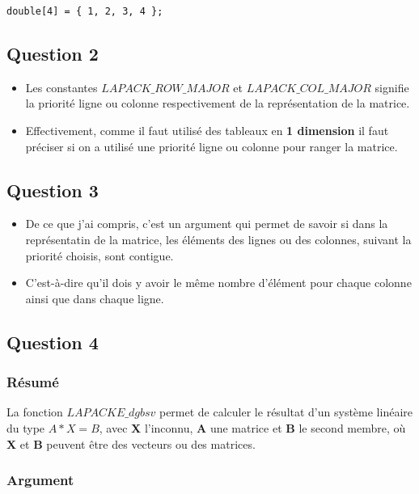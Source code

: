 \documentclass[11pt]{article}
\begin{document}
\begin{verbatim}
double[4] = { 1, 2, 3, 4 };
\end{verbatim}

\subsection{Question 2}
\label{sec:org1adee99}

\begin{itemize}
\item Les constantes \(LAPACK\_ROW\_MAJOR\) et \(LAPACK\_COL\_MAJOR\)
signifie la priorité ligne ou colonne respectivement de la
représentation de la matrice.
\item Effectivement, comme il faut utilisé des tableaux en \textbf{1 dimension}
il faut préciser si on a utilisé une priorité ligne ou colonne pour
ranger la matrice.
\end{itemize}

\subsection{Question 3}
\label{sec:org107d882}

\begin{itemize}
\item De ce que j'ai compris, c'est un argument qui permet de savoir si
dans la représentatin de la matrice, les éléments des lignes ou des
colonnes, suivant la priorité choisis, sont contigue.

\item C'est-à-dire qu'il dois y avoir le même nombre d'élément pour
chaque colonne ainsi que dans chaque ligne.
\end{itemize}

\subsection{Question 4}
\label{sec:orgcd666c8}
\subsubsection{Résumé}
\label{sec:org462cb27}

La fonction \(LAPACKE\_dgbsv\) permet de calculer le résultat d'un
système linéaire du type \(A * X = B\), avec \textbf{X} l'inconnu, \textbf{A} une
matrice et \textbf{B} le second membre, où \textbf{X} et \textbf{B} peuvent être des
vecteurs ou des matrices.

\subsubsection{Argument}
\label{sec:org010939b}
\end{document}
